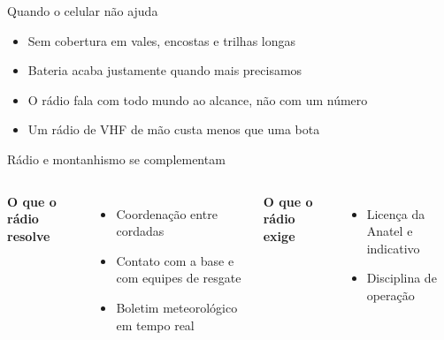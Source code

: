 
\begin{frame}{Quando o celular não ajuda}
  \begin{itemize}[<+->]
    \item Sem cobertura em vales, encostas e trilhas longas
    \item Bateria acaba justamente quando mais precisamos
    \item O rádio fala com \alert{todo mundo ao alcance}, não com um número
    \item Um rádio de \alert{VHF} de mão custa menos que uma bota
  \end{itemize}
\end{frame}

\begin{frame}{Rádio e montanhismo se complementam}
  \begin{columns}[T,onlytextwidth]
      \textbf{O que o rádio resolve}
      \begin{itemize}
        \item Coordenação entre cordadas
        \item Contato com a base e com equipes de resgate
        \item Boletim meteorológico em tempo real
      \end{itemize}
      \vspace{0.5em}
      \textbf{O que o rádio exige}
      \begin{itemize}
        \item Licença da Anatel e indicativo
        \item Disciplina de operação
      \end{itemize}
  \end{columns}
\end{frame}


